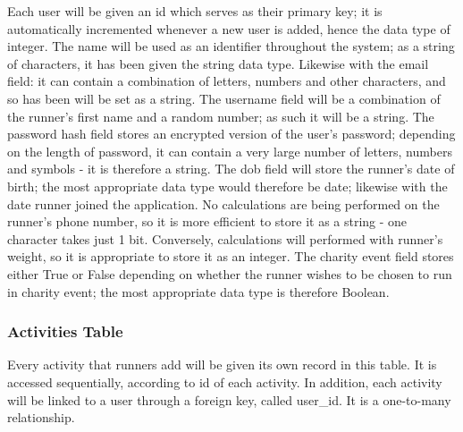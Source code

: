 \documentclass{article}[12pt,a4paper]
\begin{document}
Each user will be given an id which serves as their primary key; it is automatically incremented whenever a new user is added, hence the data type of integer. The name will be used as an identifier throughout the system; as a string of characters, it has been given the string data type. Likewise with the email field: it can contain a combination of letters, numbers and other characters, and so has been will be set as a string. The username field will be a combination of the runner's first name and a random number; as such it will be a string. The password hash field stores an encrypted version of the user's password; depending on the length of password, it can contain a very large number of letters, numbers and symbols - it is therefore a string. The dob field will store the runner's date of birth; the most appropriate data type would therefore be date; likewise with the date runner joined the application. No calculations are being performed on the runner's phone number, so it is more efficient to store it as a string - one character takes just 1 bit. Conversely, calculations will performed with runner's weight, so it is appropriate to store it as an integer. The charity event field stores either True or False depending on whether the runner wishes to be chosen to run in charity event; the most appropriate data type is therefore Boolean.

\subsubsection{Activities Table}

Every activity that runners add will be given its own record in this table. It is accessed sequentially, according to id of each activity. In addition, each activity will be linked to a user through a foreign key, called user\_id. It is a one-to-many relationship.
\end{document}
